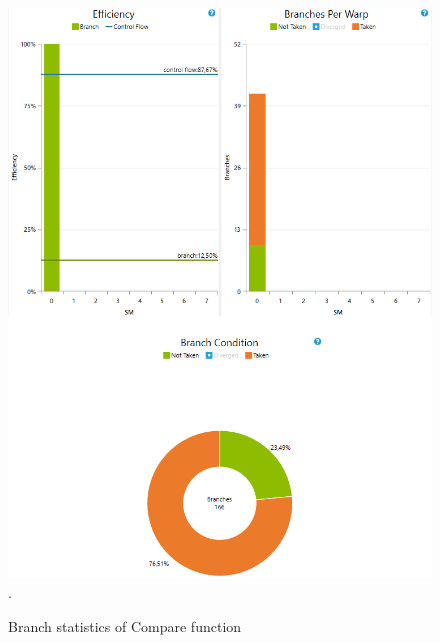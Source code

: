 \documentclass[oneside,openright,12pt,final,en]{mgr}
\begin{document}
\begin{figure}[H]
	\centering
	\includegraphics[width=\textwidth]{compare_branch}.
	\caption{Branch statistics of Compare function}
	\label{fig:compare_branch}
\end{figure}
\end{document}
